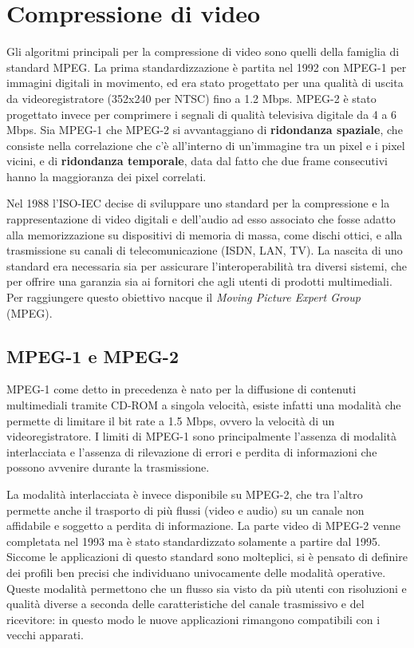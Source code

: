 \chapter{Compressione di video}
Gli algoritmi principali per la compressione di video sono quelli della famiglia di standard MPEG. La prima standardizzazione è partita nel 1992 con MPEG-1 per immagini digitali in movimento, ed era stato progettato per una qualità di uscita da videoregistratore (352x240 per NTSC) fino a 1.2 Mbps. MPEG-2 è stato progettato invece per comprimere i segnali di qualità televisiva digitale da 4 a 6 Mbps. Sia MPEG-1 che MPEG-2 si avvantaggiano di \textbf{ridondanza spaziale}, che consiste nella correlazione che c'è all'interno di un'immagine tra un pixel e i pixel vicini, e di \textbf{ridondanza temporale}, data dal fatto che due frame consecutivi hanno la maggioranza dei pixel correlati.

\vspace{5mm}

Nel 1988 l'ISO-IEC decise di sviluppare uno standard per la compressione e la rappresentazione di video digitali e dell'audio ad esso associato che fosse adatto alla memorizzazione su dispositivi di memoria di massa, come dischi ottici, e alla trasmissione su canali di telecomunicazione (ISDN, LAN, TV). La nascita di uno standard era necessaria sia per assicurare l'interoperabilità tra diversi sistemi, che per offrire una garanzia sia ai fornitori che agli utenti di prodotti multimediali. Per raggiungere questo obiettivo nacque il \textit{Moving Picture Expert Group} (MPEG).

\section{MPEG-1 e MPEG-2}
MPEG-1 come detto in precedenza è nato per la diffusione di contenuti multimediali tramite CD-ROM a singola velocità, esiste infatti una modalità che permette di limitare il bit rate a 1.5 Mbps, ovvero la velocità di un videoregistratore. I limiti di MPEG-1 sono principalmente l'assenza di modalità interlacciata e l'assenza di rilevazione di errori e perdita di informazioni che possono avvenire durante la trasmissione.

La modalità interlacciata è invece disponibile su MPEG-2, che tra l'altro permette anche il trasporto di più flussi (video e audio) su un canale non affidabile e soggetto a perdita di informazione. La parte video di MPEG-2 venne completata nel 1993 ma è stato standardizzato solamente a partire dal 1995. Siccome le applicazioni di questo standard sono molteplici, si è pensato di definire dei profili ben precisi che individuano univocamente delle modalità operative. Queste modalità permettono che un flusso sia visto da più utenti con risoluzioni e qualità diverse a seconda delle caratteristiche del canale trasmissivo e del ricevitore: in questo modo le nuove applicazioni rimangono compatibili con i vecchi apparati.

